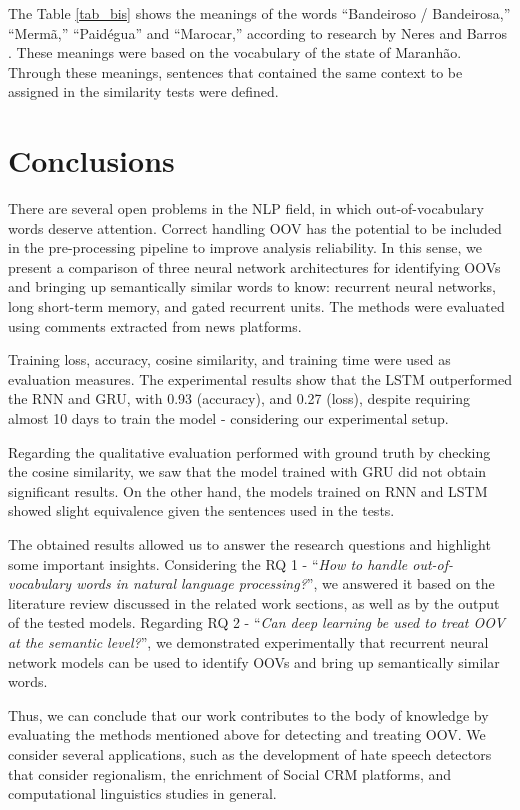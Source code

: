 \documentclass[conference]{IEEEtran}
\begin{document}
The Table \ref{tab_bis} shows the meanings of the words ``Bandeiroso / Bandeirosa,'' ``Mermã,'' ``Paidégua'' and ``Marocar,'' according to research by Neres and Barros \cite{b25}. These meanings were based on the vocabulary of the state of Maranhão. Through these meanings, sentences that contained the same context to be assigned in the similarity tests were defined.

\section{Conclusions}
There are several open problems in the NLP field, in which out-of-vocabulary words deserve attention. Correct handling OOV has the potential to be included in the pre-processing pipeline to improve analysis reliability. In this sense, we present a comparison of three neural network architectures for identifying OOVs and bringing up semantically similar words to know: recurrent neural networks, long short-term memory, and gated recurrent units. The methods were evaluated using comments extracted from news platforms.

Training loss, accuracy, cosine similarity, and training time were used as evaluation measures. The experimental results show that the LSTM outperformed the RNN and GRU, with 0.93 (accuracy), and 0.27 (loss), despite requiring almost 10 days to train the model - considering our experimental setup.

Regarding the qualitative evaluation performed with ground truth by checking the cosine similarity, we saw that the model trained with GRU did not obtain significant results. On the other hand, the models trained on RNN and LSTM showed slight equivalence given the sentences used in the tests.

The obtained results allowed us to answer the research questions and highlight some important insights. Considering the RQ 1 - ``\textit{How to handle out-of-vocabulary words in natural language processing?}'', we answered it based on the literature review discussed in the related work sections, as well as by the output of the tested models. Regarding RQ 2 - ``\textit{Can deep learning be used to treat OOV at the semantic level?}'', we demonstrated experimentally that recurrent neural network models can be used to identify OOVs and bring up semantically similar words.

Thus, we can conclude that our work contributes to the body of knowledge by evaluating the methods mentioned above for detecting and treating OOV. We consider several applications, such as the development of hate speech detectors that consider regionalism, the enrichment of Social CRM platforms, and computational linguistics studies in general.
\end{document}
